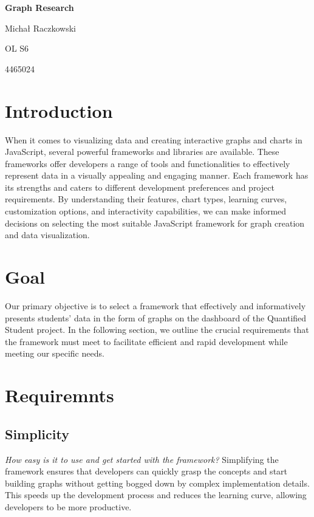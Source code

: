 \documentclass[a4paper, 11pt]{article}
\begin{document}
\begin{titlepage}
	\setlength{\parindent}{0pt}
	\vspace*{.15\textheight}
	\medbreak
	{\Huge\bfseries\color{MSBlue} Graph Research\par}
	\bigbreak
    \bigbreak
	{Michał Raczkowski\par}
    \smallbreak
    {\small OL S6\par}
    \smallbreak
    {\small 4465024\par}
\end{titlepage}

\pagebreak

\tableofcontents

\pagebreak


\section{Introduction}
When it comes to visualizing data and creating interactive graphs and charts in JavaScript, several powerful frameworks and libraries are available. These frameworks offer developers a range of tools and functionalities to effectively represent data in a visually appealing and engaging manner. 
Each framework has its strengths and caters to different development preferences and project requirements. By understanding their features, chart types, learning curves, customization options, and interactivity capabilities, we can make informed decisions on selecting the most suitable JavaScript framework for graph creation and data visualization.

\section{Goal}
Our primary objective is to select a framework that effectively and informatively presents students' data in the form of graphs on the dashboard of the Quantified Student project. In the following section, we outline the crucial requirements that the framework must meet to facilitate efficient and rapid development while meeting our specific needs.

\section{Requiremnts}
    \subsection{Simplicity}
    \textit{How easy is it to use and get started with the framework?}
    \smallbreak
    Simplifying the framework ensures that developers can quickly grasp the concepts and start building graphs without getting bogged down by complex implementation details. This speeds up the development process and reduces the learning curve, allowing developers to be more productive.
\end{document}
